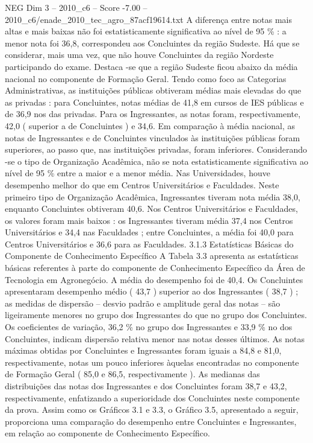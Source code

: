 \begin{textsample}{NEG Dim 3 – 2010\_c6 – Score -7.00 – 2010\_c6/enade\_2010\_tec\_agro\_87acf19614.txt}
A diferença entre notas mais altas e mais baixas não foi estatisticamente significativa ao nível de 95 \% : a menor nota foi 36,8, correspondeu aos Concluintes da região Sudeste.
Há que se considerar, mais uma vez, que não houve Concluintes da região Nordeste participando do exame.
Destaca -se que a região Sudeste ficou abaixo da média nacional no componente de Formação Geral.
Tendo como foco as Categorias Administrativas, as instituições públicas obtiveram médias mais elevadas do que as privadas : para Concluintes, notas médias de 41,8 em cursos de IES públicas e de 36,9 nos das privadas.
Para os Ingressantes, as notas foram, respectivamente, 42,0 ( superior a de Concluintes ) e 34,6.
Em comparação à média nacional, as notas de Ingressantes e de Concluintes vinculados às instituições públicas foram superiores, ao passo que, nas instituições privadas, foram inferiores.
Considerando -se o tipo de Organização Acadêmica, não se nota estatisticamente significativa ao nível de 95 \% entre a maior e a menor média.
Nas Universidades, houve desempenho melhor do que em Centros Universitários e Faculdades.
Neste primeiro tipo de Organização Acadêmica, Ingressantes tiveram nota média 38,0, enquanto Concluintes obtiveram 40,6.
Nos Centros Universitários e Faculdades, os valores foram mais baixos : os Ingressantes tiveram média 37,4 nos Centros Universitários e 34,4 nas Faculdades ; entre Concluintes, a média foi 40,0 para Centros Universitários e 36,6 para as Faculdades. 3.1.3 Estatísticas Básicas do Componente de Conhecimento Específico A Tabela 3.3 apresenta as estatísticas básicas referentes à parte do componente de Conhecimento Específico da Área de Tecnologia em Agronegócio.
A média do desempenho foi de 40,4.
Os Concluintes apresentaram desempenho médio ( 43,7 ) superior ao dos Ingressantes ( 38,7 ) ; as medidas de dispersão – desvio padrão e amplitude geral das notas – são ligeiramente menores no grupo dos Ingressantes do que no grupo dos Concluintes.
Os coeficientes de variação, 36,2 \% no grupo dos Ingressantes e 33,9 \% no dos Concluintes, indicam dispersão relativa menor nas notas desses últimos.
As notas máximas obtidas por Concluintes e Ingressantes foram iguais a 84,8 e 81,0, respectivamente, notas um pouco inferiores àquelas encontradas no componente de Formação Geral ( 85,0 e 86,5, respectivamente ).
As medianas das distribuições das notas dos Ingressantes e dos Concluintes foram 38,7 e 43,2, respectivamente, enfatizando a superioridade dos Concluintes neste componente da prova.
Assim como os Gráficos 3.1 e 3.3, o Gráfico 3.5, apresentado a seguir, proporciona uma comparação do desempenho entre Concluintes e Ingressantes, em relação ao componente de Conhecimento Específico.

\end{textsample}
